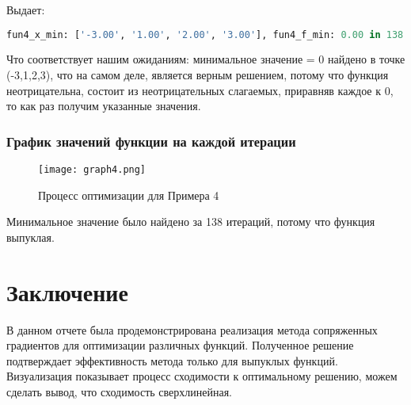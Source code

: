 \documentclass{article}
\begin{document}
Выдает:

\begin{lstlisting}[language=Python]
fun4_x_min: ['-3.00', '1.00', '2.00', '3.00'], fun4_f_min: 0.00 in 138 iterations
\end{lstlisting}

Что соответствует нашим ожиданиям: минимальное значение = 0 найдено в точке (-3,1,2,3), что на самом деле, является верным решением, потому что функция неотрицательна, состоит из неотрицательных слагаемых, приравняв каждое к 0, то как раз получим указанные значения.

\subsubsection{График значений функции на каждой итерации}

\begin{figure}[H]
    \centering
    \texttt{[image: graph4.png]}
    \caption{Процесс оптимизации для Примера 4}
\end{figure}

Минимальное значение было найдено за 138 итераций, потому что функция выпуклая.


\newpage
\section{Заключение}
В данном отчете была продемонстрирована реализация метода сопряженных градиентов для оптимизации различных функций. Полученное решение подтверждает эффективность метода только для выпуклых функций. Визуализация показывает процесс сходимости к оптимальному решению, можем сделать вывод, что сходимость сверхлинейная.
\end{document}
